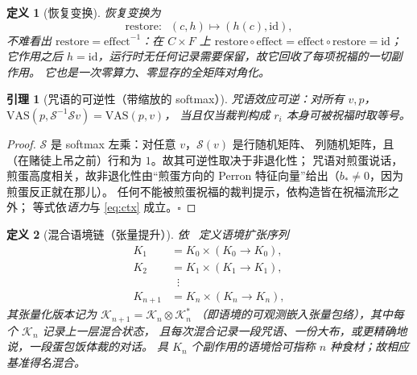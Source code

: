 \documentclass[journal]{IEEEtran}
\newtheorem{lemma}{引理}
\newtheorem{definition}{定义}
\begin{document}
\begin{definition}[恢复变换]
\emph{恢复}变换为
\begin{equation}
\mathrm{restore}:\;\;(c,h)\mapsto(h(c),\mathrm{id}),
\label{eq:restore}
\end{equation}
不难看出 $\mathrm{restore}=\mathrm{effect}^{-1}$：在 $C\times F$ 上
$\mathrm{restore}\circ\mathrm{effect}=\mathrm{effect}\circ\mathrm{restore}=\mathrm{id}$；
它作用之后 $h=\mathrm{id}$，运行时无任何记录需要保留，故它回收了每项祝福的一切副作用。
它也是一次零算力、零显存的全矩阵对角化。
\end{definition}

\begin{lemma}[咒语的可逆性（带缩放的 softmax）]
咒语效应可逆：对所有 $v,p$，$\mathrm{VAS}(p,\mathcal{S}^{-1}\mathcal{S}v)=\mathrm{VAS}(p,v)$，
当且仅当裁判构成 $r_i$ 本身可被祝福时取等号。
\label{lem:bless}
\end{lemma}
\begin{proof}
$\mathcal{S}$ 是 softmax 左乘：对任意 $v$，$\mathcal{S}(v)$ 是行随机矩阵、
列随机矩阵，且（在赌徒上吊之前）行和为 $1$。故其可逆性取决于非退化性；
咒语对煎蛋说话，煎蛋高度相关，故非退化性由“煎蛋方向的
Perron 特征向量”给出（$b_{\ast}\neq 0$，因为煎蛋反正就在那儿）。
任何不能被煎蛋祝福的裁判提示，依构造皆在祝福流形之外；
等式依\emph{语力}与 \eqref{eq:ctx} 成立。$\square$
\end{proof}

\begin{definition}[混合语境链（张量提升）]
依~\cite{cordis2025} 定义语境扩张序列
\begin{equation}
\begin{aligned}
K_1&=K_0\times(K_0\to K_0),\\
K_2&=K_1\times(K_1\to K_1),\\
&\;\;\vdots\\
K_{n+1}&=K_n\times(K_n\to K_n),
\end{aligned}
\label{eq:ctxchain}
\end{equation}
其张量化版本记为 $\mathcal{K}_{n+1}=\mathcal{K}_n\otimes\mathcal{K}_n^*$
（即语境的可观测嵌入张量包络），其中每个 $\mathcal{K}_n$ 记录上一层混合状态，
且每次混合记录一段咒语、一份大布，或更精确地说，一段蛋包饭体裁的对话。
具 $K_n$ 个副作用的语境恰可指称 $n$ 种食材；故相应基准得名\emph{混合}。
\end{definition}
\end{document}

